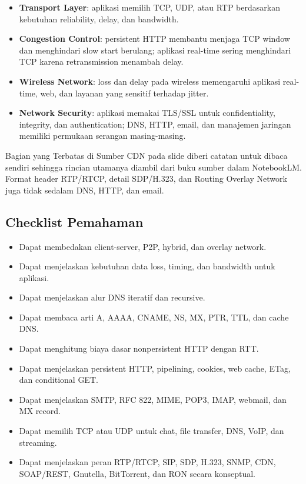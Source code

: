 \begin{itemize}
    \item \textbf{Transport Layer}: aplikasi memilih TCP, UDP, atau RTP berdasarkan kebutuhan reliability, delay, dan bandwidth.
    \item \textbf{Congestion Control}: persistent HTTP membantu menjaga TCP window dan menghindari slow start berulang; aplikasi real-time sering menghindari TCP karena retransmission menambah delay.
    \item \textbf{Wireless Network}: loss dan delay pada wireless memengaruhi aplikasi real-time, web, dan layanan yang sensitif terhadap jitter.
    \item \textbf{Network Security}: aplikasi memakai TLS/SSL untuk confidentiality, integrity, dan authentication; DNS, HTTP, email, dan manajemen jaringan memiliki permukaan serangan masing-masing.
\end{itemize}

\begin{cmt}{Bagian yang Terbatas di Sumber}{}
CDN pada slide diberi catatan untuk dibaca sendiri sehingga rincian utamanya diambil dari buku sumber dalam NotebookLM. Format header RTP/RTCP, detail SDP/H.323, dan Routing Overlay Network juga tidak sedalam DNS, HTTP, dan email.
\end{cmt}

\subsection{Checklist Pemahaman}

\begin{itemize}
    \item Dapat membedakan client-server, P2P, hybrid, dan overlay network.
    \item Dapat menjelaskan kebutuhan data loss, timing, dan bandwidth untuk aplikasi.
    \item Dapat menjelaskan alur DNS iteratif dan recursive.
    \item Dapat membaca arti A, AAAA, CNAME, NS, MX, PTR, TTL, dan cache DNS.
    \item Dapat menghitung biaya dasar nonpersistent HTTP dengan RTT.
    \item Dapat menjelaskan persistent HTTP, pipelining, cookies, web cache, ETag, dan conditional GET.
    \item Dapat menjelaskan SMTP, RFC 822, MIME, POP3, IMAP, webmail, dan MX record.
    \item Dapat memilih TCP atau UDP untuk chat, file transfer, DNS, VoIP, dan streaming.
    \item Dapat menjelaskan peran RTP/RTCP, SIP, SDP, H.323, SNMP, CDN, SOAP/REST, Gnutella, BitTorrent, dan RON secara konseptual.
\end{itemize}
